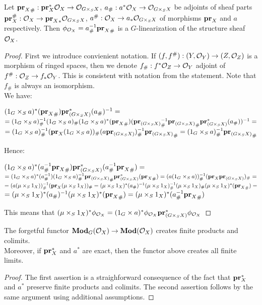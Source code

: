 \begin{proposition}
Let ${\mathbf{pr}_X}_{\#}:\mathbf{pr}^*_X{\mathcal O}_X\rightarrow {\mathcal O}_{G\times_SX}$, $a_{\#}:a^*{\mathcal O}_X\rightarrow {\mathcal O}_{G\times_SX}$ be adjoints of sheaf parts $\mathbf{pr}_X^{\#}:{\mathcal O}_X\rightarrow {\mathbf{pr}_X}_*{\mathcal O}_{G\times_SX}$, $a^{\#}:{\mathcal O}_X\rightarrow a_*{\mathcal O}_{G\times_SX}$ of morphisms $\mathbf{pr}_X$ and $a$ respectively. Then $\phi_{{\mathcal O}_X}=a_{\#}^{-1}{\mathbf{pr}_X}_{\#}$ is a $G$-linearization of the structure sheaf ${\mathcal O}_X$.
\end{proposition}
\begin{proof}
First we introduce convienient notation. If $(f,f^{\#}):(Y,{\mathcal O}_Y)\rightarrow (Z,{\mathcal O}_Z)$ is a morphism of ringed spaces, then we denote $f_{\#}:f^*{\mathcal O}_Z\rightarrow {\mathcal O}_Y$ adjoint of $f^{\#}:{\mathcal O}_Z\rightarrow f_*{\mathcal O}_Y$. This is consistent with notation from the statement. Note that $f_{\#}$ is always an isomorphism.\\
We have:
\begin{center}
$(1_G\times_Sa)^*({\mathbf{pr}_X}_{\#})\mathbf{pr}_{(G\times_SX)}^*(a_{\#})^{-1}=$\\$=(1_G\times_Sa)_{\#}^{-1}(1_G\times_Sa)_{\#}(1_G\times_Sa)^*({\mathbf{pr}_X}_{\#})({\mathbf{pr}_{(G\times_SX)}}_{\#}^{-1}{\mathbf{pr}_{(G\times_SX)}}_{\#}\mathbf{pr}_{(G\times_SX)}^*(a_{\#}))^{-1}=$\\$=(1_G\times_Sa)_{\#}^{-1}(\mathbf{pr}_X(1_G\times_Sa))_{\#}(a\mathbf{pr}_{(G\times_SX)})_{\#}^{-1}{\mathbf{pr}_{(G\times_SX)}}_{\#}=(1_G\times_Sa)_{\#}^{-1}{\mathbf{pr}_{(G\times_SX)}}_{\#}$
\end{center}
Hence:
\begin{center}
$(1_G\times_Sa)^*(a_{\#}^{-1}{\mathbf{pr}_X}_{\#})\mathbf{pr}_{(G\times_SX)}^*(a_{\#}^{-1}{\mathbf{pr}_X}_{\#})=$\\$=(1_G\times_Sa)^*(a_{\#}^{-1})(1_G\times_Sa)_{\#}^{-1}{\mathbf{pr}_{(G\times_SX)}}_{\#}\mathbf{pr}_{(G\times_SX)}^*({\mathbf{pr}_X}_{\#})=(a(1_G\times_Sa))_{\#}^{-1}(\mathbf{pr}_X\mathbf{pr}_{(G\times_SX)})_{\#}=$\\$=(a(\mu\times_S1_X))^{-1}_{\#}(\mathbf{pr}_X(\mu\times_S1_X))_{\#}=(\mu\times_S1_X)^*(a_{\#})^{-1}(\mu\times_S1_X)^{-1}_{\#}(\mu\times_S1_X)_{\#}(\mu\times_S1_X)^*({\mathbf{pr}_X}_{\#})=$\\$=(\mu\times_S1_X)^*(a_{\#})^{-1}(\mu\times_S1_X)^*({\mathbf{pr}_X}_{\#})=(\mu\times_S1_X)^*(a_{\#}^{-1}{\mathbf{pr}_X}_{\#})$
\end{center}
This means that $(\mu\times_S1_X)^*\phi_{{\mathcal O}_X}=(1_G\times a)^*\phi_{{\mathcal O}_X}\mathbf{pr}_{(G\times_SX)}^*\phi_{{\mathcal O}_X}$
\end{proof}

\begin{proposition}
The forgetful functor $\mathbf{Mod}_G({\mathcal O}_X)\rightarrow \mathbf{Mod}({\mathcal O}_X)$ creates finite products and colimits.\\
Moreover, if $\mathbf{pr}^*_X$ and $a^*$ are exact, then the functor above creates all finite limits.
\end{proposition}
\begin{proof}
The first assertion is a straighforward consequence of the fact that $\mathbf{pr}_X^*$ and $a^*$ preserve finite products and colimits. The second assertion follows by the same argument using additional assumptions. 
\end{proof}


